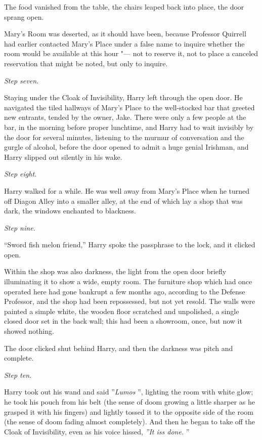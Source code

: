 The food vanished from the table, the chairs leaped back into place, the
door sprang open.

Mary's Room was deserted, as it should have been, because Professor
Quirrell had earlier contacted Mary's Place under a false name to
inquire whether the room would be available at this hour "--- not to
reserve it, not to place a canceled reservation that might be noted, but
only to inquire.

\emph{Step seven.}

Staying under the Cloak of Invisibility, Harry left through the open
door. He navigated the tiled hallways of Mary's Place to the
well-stocked bar that greeted new entrants, tended by the owner, Jake.
There were only a few people at the bar, in the morning before proper
lunchtime, and Harry had to wait invisibly by the door for several
minutes, listening to the murmur of conversation and the gurgle of
alcohol, before the door opened to admit a huge genial Irishman, and
Harry slipped out silently in his wake.

\emph{Step eight.}

Harry walked for a while. He was well away from Mary's Place when he
turned off Diagon Alley into a smaller alley, at the end of which lay a
shop that was dark, the windows enchanted to blackness.

\emph{Step nine.}

``Sword fish melon friend,'' Harry spoke the passphrase to the lock, and
it clicked open.

Within the shop was also darkness, the light from the open door briefly
illuminating it to show a wide, empty room. The furniture shop which had
once operated here had gone bankrupt a few months ago, according to the
Defense Professor, and the shop had been repossessed, but not yet
resold. The walls were painted a simple white, the wooden floor
scratched and unpolished, a single closed door set in the back wall;
this had been a showroom, once, but now it showed nothing.

The door clicked shut behind Harry, and then the darkness was pitch and
complete.

\emph{Step ten.}

Harry took out his wand and said ''\emph{Lumos} '', lighting the room with
white glow; he took his pouch from his belt (the sense of doom growing a
little sharper as he grasped it with his fingers) and lightly tossed it
to the opposite side of the room (the sense of doom fading almost
completely). And then he began to take off the Cloak of Invisibility,
even as his voice hissed, \emph{''It iss done.} ''

